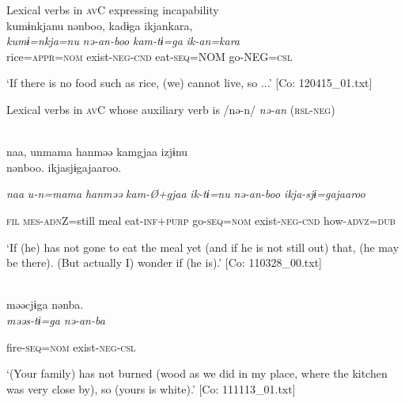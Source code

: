 \ea\label{ex:6-48}
 Lexical verbs in \textsc{av}C expressing incapability\\

 \ea {\TM}  kumɨnkjanu  nənboo,  kadɨga  ikjankara,\\
\gll \textit{kumɨ=nkja=nu}  \textit{nə-an-boo}  \textit{kam-tɨ=ga}  \textit{ik-an=kara}\\

      rice=\textsc{appr}=\textsc{nom}  exist-\textsc{neg}-\textsc{cnd}  eat-\textsc{seq}=NOM  go-NEG=\textsc{csl}

\glt ‘If there is no food such as rice, (we) cannot live, so ...’ [Co: 120415\_01.txt]
\z

  Lexical verbs in \textsc{av}C whose auxiliary verb is /nə-n/ \textit{nə-an} (\textsc{rsl}-\textsc{neg})

 \ex{}\\
{\TM}
\gll  naa,  unmama  hanməə  kamgjaa  izjɨnu\\                                                                                        nənboo.  ikjasjɨgajaaroo.

      \textit{naa}  \textit{u-n=mama}  \textit{hanməə}  \textit{kam-Ø+gjaa}  \textit{ik-tɨ=nu}                                        \textit{nə-an{}-boo  ikja-sjɨ=gajaaroo}

      \textsc{fil}  \textsc{mes}-\textsc{adn}Z=still  meal  eat-\textsc{inf}+\textsc{purp}  go-\textsc{seq}=\textsc{nom}              exist-\textsc{neg}-\textsc{cnd}  how-\textsc{advz}=\textsc{dub}







\glt ‘If (he) has not gone to eat the meal yet (and if he is not still out) that, (he may be there). (But actually I) wonder if (he is).’ [Co: 110328\_00.txt]
\z

 \ex{}\\
{\TM}
\gll  məəcjɨga  nənba.\\

      \textit{məəs-tɨ=ga}  \textit{nə-an{}-ba}

      fire-\textsc{seq}=\textsc{nom}  exist-\textsc{neg}-\textsc{csl}

\glt ‘(Your family) has not burned (wood as we did in my place, where the kitchen was very close by), so (yours is white).’ [Co: 111113\_01.txt]
\z

